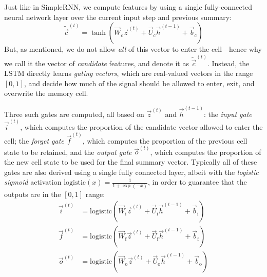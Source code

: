 Just like in SimpleRNN, we compute features by using a single fully-connected neural network layer over the current input step and previous summary:
\begin{equation}\label{eqn:lstmstart}
     \widetilde{\vec{c}}^{(t)} = \tanh(\vec{W}_c\vec{z}^{(t)} + \vec{U}_c\vec{h}^{(t-1)} + \vec{b}_c)
\end{equation}
But, as mentioned, we do not allow \emph{all} of this vector to enter the cell---hence why we call it the vector of \emph{candidate} features, and denote it as $\widetilde{\vec{c}}^{(t)}$. Instead, the LSTM directly learns \emph{gating vectors}, which are real-valued vectors in the range $[0, 1]$, and decide how much of the signal should be allowed to enter, exit, and overwrite the memory cell. 

Three such gates are computed, all based on $\vec{z}^{(t)}$ and $\vec{h}^{(t-1)}$: the \emph{input gate} $\vec{i}^{(t)}$, which computes the proportion of the candidate vector allowed to enter the cell; the \emph{forget gate} $\vec{f}^{(t)}$, which computes the proportion of the previous cell state to be retained, and the \emph{output gate} $\vec{o}^{(t)}$, which computes the proportion of the new cell state to be used for the final summary vector. Typically all of these gates are also derived using a single fully connected layer, albeit with the \emph{logistic sigmoid} activation $\mathrm{logistic}(x) = \frac{1}{1+\exp(-x)}$, in order to guarantee that the outputs are in the $[0, 1]$ range:
\begin{align}\label{eqn:lstm_gate}
     \vec{i}^{(t)} &= \mathrm{logistic}(\vec{W}_\mathrm{i}\vec{z}^{(t)} + \vec{U}_\mathrm{i}\vec{h}^{(t-1)} + \vec{b}_\mathrm{i})\\
     \vec{f}^{(t)} &= \mathrm{logistic}(\vec{W}_\mathrm{f}\vec{z}^{(t)} + \vec{U}_\mathrm{f}\vec{h}^{(t-1)} + \vec{b}_\mathrm{f})\\
     \vec{o}^{(t)} &= \mathrm{logistic}(\vec{W}_\mathrm{o}\vec{z}^{(t)} + \vec{U}_\mathrm{o}\vec{h}^{(t-1)} + \vec{b}_\mathrm{o})
\end{align}

